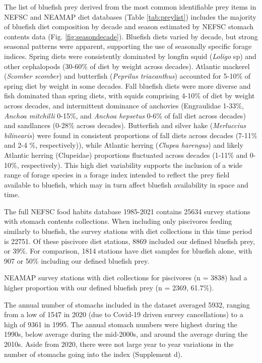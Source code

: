 \documentclass[
]{article}
\begin{document}
The list of bluefish prey derived from the most common identifiable prey items in NEFSC and NEAMAP diet databases (Table \ref{tab:preylist}) includes the majority of bluefish diet composition by decade and season estimated by NEFSC stomach contents data (Fig. \ref{fig:seasondecade}). Bluefish diets varied by decade, but strong seasonal patterns were apparent, supporting the use of seasonally specific forage indices. Spring diets were consistently dominated by longfin squid (\emph{Loligo} sp) and other cephalopods (30-60\% of diet by weight across decades). Atlantic mackerel (\emph{Scomber scomber}) and butterfish (\emph{Peprilus triacanthus}) accounted for 5-10\% of spring diet by weight in some decades. Fall bluefish diets were more diverse and fish dominated than spring diets, with squids comprising 4-10\% of diet by weight across decades, and intermittent dominance of anchovies (Engraulidae 1-33\%, \emph{Anchoa mitchilli} 0-15\%, and \emph{Anchoa hepsetus} 0-6\% of fall diet across decades) and sandlances (0-28\% across decades). Butterfish and silver hake (\emph{Merluccius bilinearis}) were found in consistent proportions of fall diets across decades (7-11\% and 2-4 \%, respectively)), while Atlantic herring (\emph{Clupea harengus}) and likely Atlantic herring (Clupeidae) proportions fluctuated across decades (1-11\% and 0-10\%, respectively). This high diet variability supports the inclusion of a wide range of forage species in a forage index intended to reflect the prey field available to bluefish, which may in turn affect bluefish availability in space and time.

The full NEFSC food habits database 1985-2021 contains 25634 survey stations with stomach contents collections. When including only piscivores feeding similarly to bluefish, the survey stations with diet collections in this time period is 22751. Of these piscivore diet stations, 8869 included our defined bluefish prey, or 39\%. For comparison, 1814 stations have diet samples for bluefish alone, with 907 or 50\% including our defined bluefish prey.

NEAMAP survey stations with diet collections for piscivores (n = 3838) had a higher proportion with our defined bluefish prey (n = 2369, 61.7\%).

The annual number of stomachs included in the dataset averaged 5932, ranging from a low of 1547 in 2020 (due to Covid-19 driven survey cancellations) to a high of 9361 in 1995. The annual stomach numbers were highest during the 1990s, below average during the mid-2000s, and around the average during the 2010s. Aside from 2020, there were not large year to year variations in the number of stomachs going into the index (Supplement d).
\end{document}
